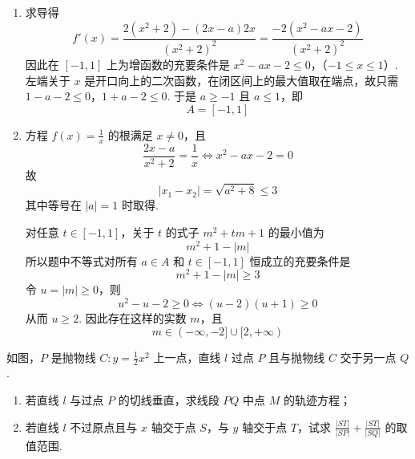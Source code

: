 \begin{solution}
\begin{enumerate}
\item 求导得
\[
f'(x)=\frac{2(x^2+2)-(2x-a)2x}{(x^2+2)^2}
 =\frac{-2(x^2-ax-2)}{(x^2+2)^2}
\]
因此在 \([-1,1]\) 上为增函数的充要条件是
\(x^2-ax-2\leqslant0\)，（\(-1\leqslant x\leqslant1\)）.
左端关于 \(x\) 是开口向上的二次函数，在闭区间上的最大值取在端点，故只需
\(1-a-2\leqslant0\)，\(1+a-2\leqslant0\).
于是 \(a\geqslant-1\) 且 \(a\leqslant1\)，即
\[
A=[-1,1]
\]

\item 方程 \(f(x)=\frac1x\) 的根满足 \(x\ne0\)，且
\[
\frac{2x-a}{x^2+2}=\frac1x
\Longleftrightarrow x^2-ax-2=0
\]
故
\[
|x_1-x_2|=\sqrt{a^2+8}\leqslant3
\]
其中等号在 \(|a|=1\) 时取得.

对任意 \(t\in[-1,1]\)，关于 \(t\) 的式子 \(m^2+tm+1\) 的最小值为
\[
m^2+1-|m|
\]
所以题中不等式对所有 \(a\in A\) 和 \(t\in[-1,1]\) 恒成立的充要条件是
\[
m^2+1-|m|\geqslant3
\]
令 \(u=|m|\geqslant0\)，则
\[
u^2-u-2\geqslant0\Longleftrightarrow (u-2)(u+1)\geqslant0
\]
从而 \(u\geqslant2\).  因此存在这样的实数 \(m\)，且
\[
m\in(-\infty,-2]\cup[2,+\infty)
\]
\end{enumerate}
\end{solution}

\begin{problem}
如图，\(P\) 是抛物线 \(C:y=\frac{1}{2}x^2\) 上一点，直线 \(l\) 过点 \(P\) 且与抛物线 \(C\) 交于另一点 \(Q\).

\begin{enumerate}
\item 若直线 \(l\) 与过点 \(P\) 的切线垂直，求线段 \(PQ\) 中点 \(M\) 的轨迹方程；
\item 若直线 \(l\) 不过原点且与 \(x\) 轴交于点 \(S\)，与 \(y\) 轴交于点 \(T\)，试求 \(\frac{|ST|}{|SP|}+\frac{|ST|}{|SQ|}\) 的取值范围.
\end{enumerate}
\end{problem}

